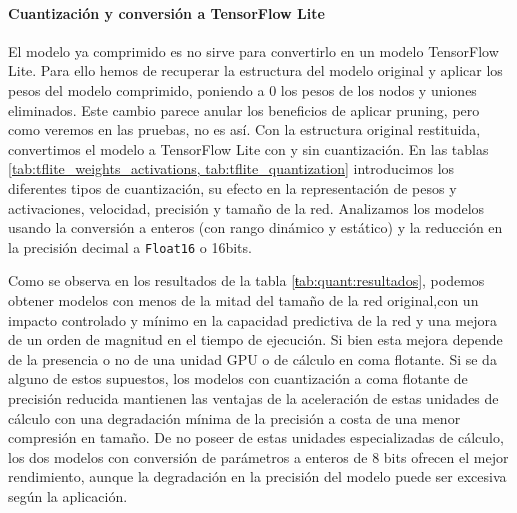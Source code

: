 \paragraph{Cuantización y conversión a TensorFlow Lite}
El modelo ya comprimido es no sirve para convertirlo en un modelo TensorFlow Lite. Para ello hemos de recuperar la estructura del modelo original y aplicar los pesos del modelo comprimido, poniendo a 0 los pesos de los nodos y uniones eliminados. Este cambio parece anular los beneficios de aplicar pruning, pero como veremos en las pruebas, no es así. 
Con la estructura original restituida, convertimos el modelo a TensorFlow Lite con y sin cuantización. En las tablas \ref{tab:tflite_weights_activations, tab:tflite_quantization}  introducimos los diferentes tipos de cuantización, su efecto en la representación de pesos y activaciones, velocidad, precisión y tamaño de la red. Analizamos los modelos usando la conversión a enteros (con rango dinámico y estático) y la reducción en la precisión decimal a \texttt{Float16} o 16bits.


Como se observa en los resultados de la tabla \ref{ŧab:quant:resultados}, podemos obtener modelos con menos de la mitad del tamaño de la red original,con un impacto controlado y mínimo en la capacidad predictiva de la red y una mejora de un orden de magnitud en el tiempo de ejecución. Si bien esta mejora depende de la presencia o no de una unidad GPU o de cálculo en coma flotante. Si se da alguno de estos supuestos, los modelos con cuantización a coma flotante de precisión reducida mantienen las ventajas de la aceleración de estas unidades de cálculo con una degradación mínima de la precisión a costa de una menor compresión en tamaño. De no poseer de estas unidades especializadas de cálculo, los dos modelos con conversión de parámetros a enteros de 8 bits ofrecen el mejor rendimiento, aunque la degradación en la precisión del modelo puede ser excesiva según la aplicación. 

